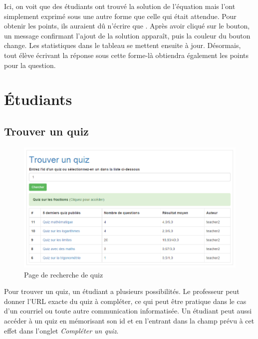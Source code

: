 \documentclass[a4,10pt,french]{sphinxmanual}
\begin{document}
Ici, on voit que des étudiants ont trouvé la solution de l'équation mais l'ont simplement exprimé sous une autre forme que celle qui était attendue. Pour obtenir les points, ils auraient dû n'écrire que . Après avoir cliqué sur le bouton, un message confirmant l'ajout de la solution apparaît, puis la couleur du bouton change. Les statistiques dans le tableau se mettent ensuite à jour. Désormais, tout élève écrivant la réponse sous cette forme-là obtiendra également les points pour la question.


\section{Étudiants}
\label{doc-user:etudiants}

\subsection{Trouver un quiz}
\label{doc-user:trouver-un-quiz}\begin{figure}[htbp]
\centering
\capstart

\includegraphics[width=0.700\linewidth]{find.png}
\caption{Page de recherche de quiz}\end{figure}

Pour trouver un quiz, un étudiant a plusieurs possibilités. Le professeur peut donner l'URL exacte du quiz à compléter, ce qui peut être pratique dans le cas d'un courriel ou toute autre communication informatisée. Un étudiant peut aussi accéder à un quiz en mémorisant son id et en l'entrant dans la champ prévu à cet effet dans l'onglet \emph{Compléter un quiz}.
\end{document}
